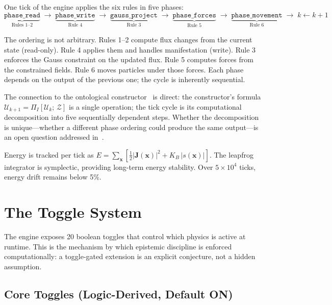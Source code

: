 \documentclass[11pt,a4paper]{article}
\newcommand{\KB}{K_B}
\theoremstyle{compact}
\begin{document}
One tick of the engine applies the six rules in five phases:
\[
\underbrace{\texttt{phase\_read}}_{\text{Rules 1--2}} \;\to\; \underbrace{\texttt{phase\_write}}_{\text{Rule 4}} \;\to\; \underbrace{\texttt{gauss\_project}}_{\text{Rule 3}} \;\to\; \underbrace{\texttt{phase\_forces}}_{\text{Rule 5}} \;\to\; \underbrace{\texttt{phase\_movement}}_{\text{Rule 6}} \;\to\; k \leftarrow k+1
\]

The ordering is not arbitrary. Rules 1--2 compute flux changes from the current state (read-only). Rule 4 applies them and handles manifestation (write). Rule 3 enforces the Gauss constraint on the updated flux. Rule 5 computes forces from the constrained fields. Rule 6 moves particles under those forces. Each phase depends on the output of the previous one; the cycle is inherently sequential.

The connection to the ontological constructor~\cite{constructor} is direct: the constructor's formula $\mathcal{U}_{k+1} = \Pi_I[\mathcal{U}_k;\, \mathcal{Z}]$ is a single operation; the tick cycle is its computational decomposition into five sequentially dependent steps. Whether the decomposition is unique---whether a different phase ordering could produce the same output---is an open question addressed in~\cite{constructor}.

Energy is tracked per tick as $E = \sum_{\mathbf{x}} [\frac{1}{2}|\mathbf{J}(\mathbf{x})|^2 + \KB\,|s(\mathbf{x})|]$. The leapfrog integrator is symplectic, providing long-term energy stability. Over $5 \times 10^4$ ticks, energy drift remains below 5\%.


\section{The Toggle System}
\label{sec:toggles}

The engine exposes 20 boolean toggles that control which physics is active at runtime. This is the mechanism by which epistemic discipline is enforced computationally: a toggle-gated extension is an explicit conjecture, not a hidden assumption.

\subsection*{Core Toggles (Logic-Derived, Default ON)}
\end{document}
